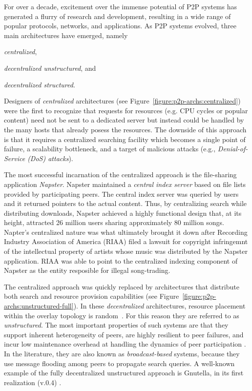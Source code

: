 For over a decade, excitement over the immense potential of P2P systems has
generated a flurry of research and development, resulting in a wide range of
popular protocols, networks, and applications. As P2P systems evolved, three
main architectures have emerged, namely
\begin{inparaenum}
  \item \emph{centralized},
  \item \emph{decentralized unstructured}, and
  \item \emph{decentralized structured}.
\end{inparaenum}

Designers of \emph{centralized} architectures (see
Figure~\ref{figure:p2p-archs:centralized}) were the first to recognize that
requests for resources (e.g. CPU cycles or popular content) need not be sent to
a dedicated server but instead could be handled by the many hosts that already
posess the resources. The downside of this approach is that it requires a
centralized searching facility which becomes a single point of failure, a
scalability bottleneck, and a target of malicious attacks (e.g.,
\emph{Denial-of-Service (DoS) attacks}).

The most successful incarnation of the centralized approach is the file-sharing
application \emph{Napster}\cite{napster}. Napster maintained a \emph{central
index server} based on file lists provided by participating peers. The central
index server was queried by users and it returned pointers to the actual
content. Thus, by centralizing search while distributing downloads,  Napster
achieved a highly functional design that, at its height, attracted 26 million
users sharing approximately 80 million songs\cite{jmm_naptopusage_2001}.
Napter's  centralized nature was what ultimately brought it down after Recording
Industry Association of America (RIAA) filed a lawsuit for copyright infringemnt
of the intellectual property of artists whose music was distributed by the
Napster application. RIAA was able to point to the centralized indexing
component of Napster as the entity resposible for illegal song-trading.
                                       
The centralized approach was quickly replaced by architectures that distribute
both search and resource provision capabilities (see
Figure~\ref{figure:p2p-archs:unstructured-full}). In these \emph{decentralized}
architectures, resource placement within the overlay topology is
random~\cite{YG-M2002}. For this reason they are referred to as
\emph{unstructured}. The most important properties of such systems are that they
support inherent heterogeneity of peers, are highly resilient to peer failures,
and incur low maintenance overhead at handling the dynamics of peer
participation \cite{stutzbach_churn_2006}. In the literature, they are also
known as \emph{broadcast-based} systems, because they use message flooding among
peers to propagate search queries. A well-known example of the fully
decentralized
unstructured approach is Gnutella, in its first realization (v.0.4)
\cite{gnutellav04}.

